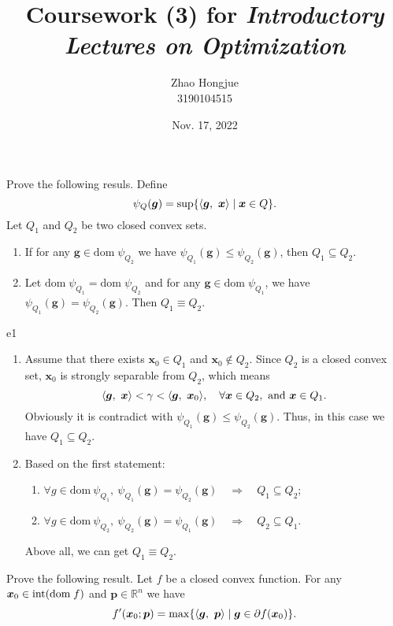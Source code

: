\documentclass{article}
\title{Coursework (3) for \emph{Introductory Lectures on Optimization}}
\author{Zhao Hongjue \\ 3190104515}
\date{Nov. 17, 2022}
\newcommand{\RBB}{\mathbb{R}}
\newcommand{\xB}{\bm{x}}
\newcommand{\gB}{\bm{g}}
\newcommand{\pB}{\bm{p}}
\newcommand{\domf}{\textrm{dom\;}f}
\begin{document}
\maketitle

\begin{excercise}\label{e1}
Prove the following resuls. Define 
\[
\psi_{Q}(\gB) = \sup \{ \innerproduct{\gB}{\xB} \mid \xB \in Q  \}.
\]
Let $Q_1$ and $Q_2$ be two closed convex sets.
\begin{enumerate}
	\item If for any $\gB \in \textrm{dom}\; \psi_{Q_2}$ we have $\psi_{Q_1} (\gB) \leq \psi_{Q_2} (\gB)$, then $Q_1 \subseteq Q_2$. 
	\item Let  $\textrm{dom}\; \psi_{Q_1} = \textrm{dom}\; \psi_{Q_2}$ and for any $\gB \in \textrm{dom}\; \psi_{Q_1}$, we have $\psi_{Q_1} (\gB) = \psi_{Q_2} (\gB)$. Then $Q_1 \equiv Q_2$.
\end{enumerate}
\end{excercise}

\begin{PROOF}{e1}
	\begin{enumerate}
		\item {
			Assume that there exists \(\xB_0 \in Q_1\) and \(\xB_0 \notin Q_2\). Since \(Q_2\) is a closed convex set, \(\xB_0\)
			is strongly separable from \(Q_2\), which means
			\[
				\innerproduct{\gB}{\xB} < \gamma  < \innerproduct{\gB}{\xB_0}, \quad \forall \xB \in Q_2, ~\text{and}~ \xB \in Q_1.
			\]
			Obviously it is contradict with \(\psi_{Q_1}(\gB) \le \psi_{Q_2}(\gB)\). Thus, in this case we have \(Q_1 \subseteq Q_2\).
		}
		\item {
			Based on the first statement:
			\begin{enumerate}
				\item \(\forall g \in \mathrm{dom}~\psi_{Q_1},~\psi_{Q_1}(\gB) = \psi_{Q_2}(\gB) \quad \Longrightarrow \quad Q_1 \subseteq Q_2\);
				\item \(\forall g \in \mathrm{dom}~\psi_{Q_2},~\psi_{Q_2}(\gB) = \psi_{Q_1}(\gB) \quad \Longrightarrow \quad Q_2 \subseteq Q_1\).
			\end{enumerate}
			Above all, we can get \(Q_1 \equiv Q_2\).
		}
	\end{enumerate}
	
\end{PROOF}

\begin{excercise}\label{e2}
Prove the following result.
Let $f$ be a closed convex function. For any $\xB_0 \in \textrm{int}(\domf)$ and $\pB \in \RBB^n$ we have
\begin{equation}
	f'(\xB_0; \pB) = \max \{ \innerproduct{\gB}{\pB} \mid \gB \in \partial f(\xB_0) \}.\nonumber
\end{equation}
\end{excercise}
\end{document}
